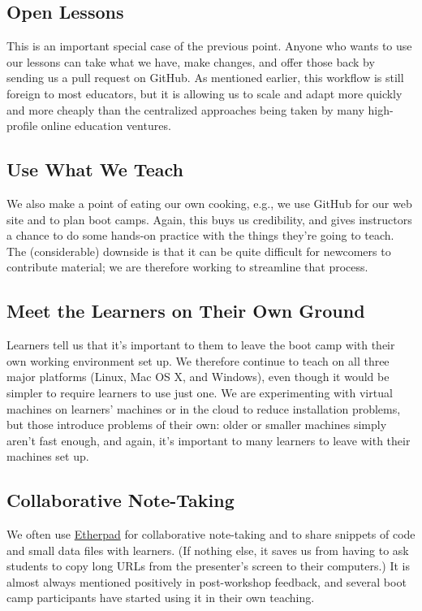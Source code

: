 \documentclass{article}
\begin{document}
\subsection{Open Lessons}

This is an important special case of the previous point. Anyone who
wants to use our lessons can take what we have, make changes, and offer
those back by sending us a pull request on GitHub. As mentioned earlier,
this workflow is still foreign to most educators, but it is allowing us
to scale and adapt more quickly and more cheaply than the centralized
approaches being taken by many high-profile online education ventures.

\subsection{Use What We Teach}

We also make a point of eating our own cooking, e.g., we use GitHub for
our web site and to plan boot camps. Again, this buys us credibility,
and gives instructors a chance to do some hands-on practice with the
things they're going to teach. The (considerable) downside is that it
can be quite difficult for newcomers to contribute material; we are
therefore working to streamline that process.

\subsection{Meet the Learners on Their Own Ground}

Learners tell us that it's important to them to leave the boot camp with
their own working environment set up. We therefore continue to teach on
all three major platforms (Linux, Mac OS X, and Windows), even though it
would be simpler to require learners to use just one. We are
experimenting with virtual machines on learners' machines or in the
cloud to reduce installation problems, but those introduce problems of
their own: older or smaller machines simply aren't fast enough, and
again, it's important to many learners to leave with their machines set
up.

\subsection{Collaborative Note-Taking}

We often use \href{http://etherpad.org}{Etherpad} for collaborative
note-taking and to share snippets of code and small data files with
learners. (If nothing else, it saves us from having to ask students to
copy long URLs from the presenter's screen to their computers.) It is
almost always mentioned positively in post-workshop feedback, and
several boot camp participants have started using it in their own
teaching.
\end{document}
